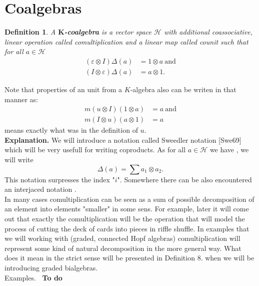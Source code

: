 \documentclass[a4paper, 12pt]{report}
\newtheorem{definition}{Definition}
\newcommand{\smalltodo}[1]{\textbf{\ To do}}
\begin{document}
\section{Coalgebras}
\begin{definition}
A \textbf{$\textbf{K}$-coalgebra} is a vector space $\mathcal{H}$
with additional coassociative, linear operation
 called comultiplication and
a linear map  called counit such that for all
$a \in \mathcal{H}$
\begin{align*}
(\varepsilon \otimes I)\Delta(a) &= 1 \otimes a \mathrm{\ and} \\
(I \otimes \varepsilon)\Delta(a) &= a \otimes 1.
\end{align*}
\end{definition}
Note that properties of an unit from a $K$-algebra also can be writen in that manner as:
\begin{align*}
m(u \otimes I)(1 \otimes a) &= a \mathrm{\ and}\\
m(I \otimes u)(a \otimes 1) &= a
\end{align*}
means exactly what was in the definition of $u$. \\[8pt]
\textbf{Explanation.} We will introduce a notation called Sweedler notation [Swe69] which will be
very usefull
for writing coproducts. As for all $a \in \mathcal{H}$ we have
, we will write
\begin{equation*}
\Delta(a) = \displaystyle\sum a_1 \otimes a_2.
\end{equation*}
This notation surpresses the index "$i$". Somewhere there can be also encountered an interjaced
notation . \\
In many cases comultiplication can be seen as a sum of possible decomposition of an element into
elements "smaller" in some sens.
For example, later it will come out that exactly the comultiplication will be the operation that will
model the process of cutting the deck of cards into pieces in riffle shuffle. In examples that we will 
working with (graded, connected Hopf algebras) comultiplication will represent some kind of natural 
decomposition in the more general way. What does it mean in the strict sense will be presented in 
Definition 8. when we will be introducing graded bialgebras. \\
Examples. \smalltodo{}  \\[8pt]
\end{document}
